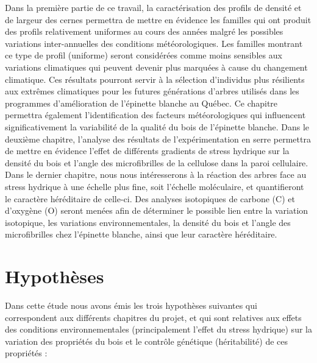 \documentclass{report}
\begin{document}
   
Dans la première partie de ce travail, la caractérisation des profils de densité et de largeur des cernes permettra de mettre en évidence les familles qui ont produit des profils relativement \og uniformes \fg au cours des années malgré les possibles variations inter-annuelles des conditions météorologiques. Les familles montrant ce type de profil (uniforme) seront considérées comme moins sensibles aux variations climatiques qui peuvent devenir plus marquées à cause du changement climatique. Ces résultats pourront servir à la sélection d'individus plus résilients aux extrêmes climatiques pour les futures générations d'arbres utilisés dans les programmes d'amélioration de l'épinette blanche au Québec. Ce chapitre permettra également l'identification des facteurs météorologiques qui influencent significativement la variabilité de la qualité du bois de l'épinette blanche. Dans le deuxième chapitre, l'analyse des résultats de l'expérimentation en serre permettra de mettre en évidence l'effet de différents gradients de stress hydrique sur la densité du bois et l'angle des microfibrilles de la cellulose dans la paroi cellulaire. Dans le dernier chapitre, nous nous intéresserons à la réaction des arbres face au stress hydrique à une échelle plus fine, soit l'échelle moléculaire, et quantifieront le caractère héréditaire de celle-ci. Des analyses isotopiques de carbone (C) et d'oxygène (O) seront menées afin de déterminer le possible lien entre la variation isotopique, les variations environnementales, la densité du bois et l'angle des microfibrilles chez l'épinette blanche, ainsi que leur caractère héréditaire. \\


\section*{Hypothèses}

Dans cette étude nous avons émis les trois hypothèses suivantes qui correspondent aux différents chapitres du projet, et qui sont relatives aux effets des conditions environnementales (principalement l'effet du stress hydrique) sur la variation des propriétés du bois et le contrôle génétique (héritabilité) de ces propriétés :\\
\end{document}

